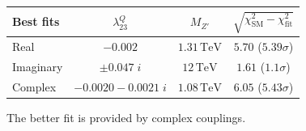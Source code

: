 \documentclass[mathserif, 10pt]{beamer}
\begin{document}
\begin{frame}
\begin{figure}
\begin{columns}
\begin{column}{0.48\textwidth}
            \end{column}
        \end{columns}
    \end{figure}
    \begin{table}
        \centering
        \begin{tabular}{|l|c|c|c|}\hline
            \textbf{Best fits} & $\lambda^Q_{23}$    & $M_{Z'}$             & $\sqrt{\chi^2_\mathrm{SM} - \chi^2_\mathrm{fit}}$ \\\hline
            Real               & $-0.002$            & $1.31\,\mathrm{TeV}$ & $5.70$ \quad (\alert{$5.39\sigma$})               \\\hline
            Imaginary          & $\pm 0.047\;i$      & $12\,\mathrm{TeV}$   & $1.61$  \quad (\alert{$1.1\sigma$})               \\\hline
            Complex            & $-0.0020-0.0021\;i$ & $1.08\,\mathrm{TeV}$ & $6.05$ \quad (\alert{$5.43\sigma$})               \\\hline
        \end{tabular}
    \end{table}

    The better fit is provided by complex couplings.
\end{frame}
\end{document}
